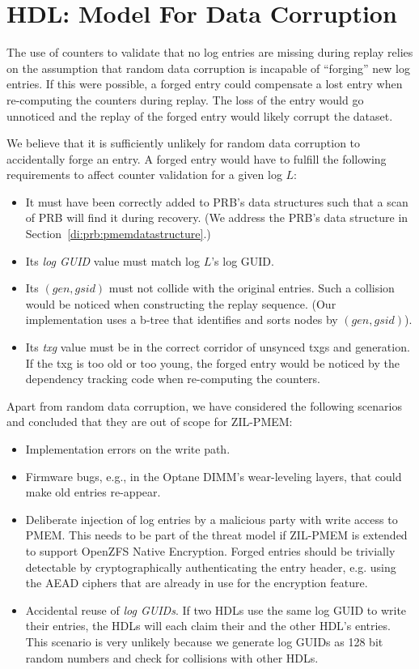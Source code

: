 \documentclass[12pt,a4paper,twoside]{book}
\begin{document}
\section{HDL: Model For Data Corruption}\label{di:prb:modeldatacorruption}
The use of counters to validate that no log entries are missing during replay relies on the assumption that random data corruption is incapable of ``forging'' new log entries.
If this were possible, a forged entry could compensate a lost entry when re-computing the counters during replay.
The loss of the entry would go unnoticed and the replay of the forged entry would likely corrupt the dataset.

We believe that it is sufficiently unlikely for random data corruption to accidentally forge an entry.
A forged entry would have to fulfill the following requirements to affect counter validation for a given log $L$:
\begin{itemize}[noitemsep]
    \item It must have been correctly added to PRB's data structures such that a scan of PRB will find it during recovery.
        (We address the PRB's data structure in Section~\ref{di:prb:pmemdatastructure}.)
    \item Its \textit{log GUID} value must match log $L$'s log GUID.
    \item Its $(gen, gsid)$ must not collide with the original entries.
        Such a collision would be noticed when constructing the replay sequence.
        (Our implementation uses a b-tree that identifies and sorts nodes by $(gen, gsid)$).
    \item Its \textit{txg} value must be in the correct corridor of unsynced txgs and generation.
        If the txg is too old or too young, the forged entry would be noticed by the dependency tracking code when re-computing the counters.
\end{itemize}

Apart from random data corruption, we have considered the following scenarios and concluded that they are out of scope for ZIL-PMEM:
\begin{itemize}[noitemsep]
\item Implementation errors on the write path.
\item Firmware bugs, e.g., in the Optane DIMM's wear-leveling layers, that could make old entries re-appear.
\item Deliberate injection of log entries by a malicious party with write access to PMEM.
    This needs to be part of the threat model if ZIL-PMEM is extended to support OpenZFS Native Encryption.
    Forged entries should be trivially detectable by cryptographically authenticating the entry header, e.g. using the AEAD ciphers that are already in use for the encryption feature.
\item Accidental reuse of \textit{log GUIDs}.
    If two HDLs use the same log GUID to write their entries, the HDLs will each claim their and the other HDL's entries.
    This scenario is very unlikely because we generate log GUIDs as 128 bit random numbers and check for collisions with other HDLs.
\end{itemize}
\end{document}
